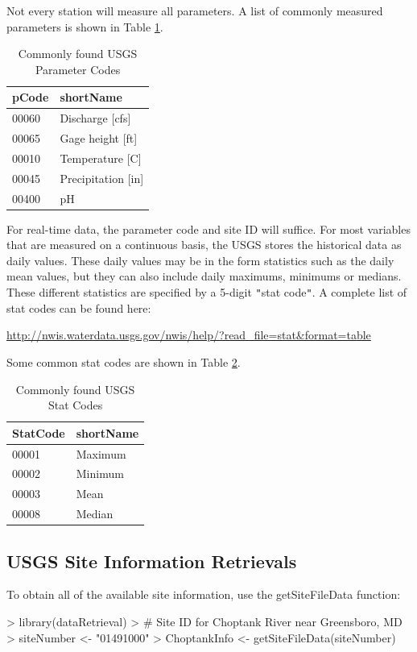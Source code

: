\documentclass[a4paper,11pt]{article}
\begin{document}
Not every station will measure all parameters. A list of commonly measured parameters is shown in Table \ref{tab:params}.



\begin{table}[ht]
\centering
\caption{Commonly found USGS Parameter Codes} 
\label{tab:params}
\begin{tabular}{ll}
  \hline
pCode & shortName \\ 
  \hline
00060 & Discharge [cfs] \\ 
  00065 & Gage height [ft] \\ 
  00010 & Temperature [C] \\ 
  00045 & Precipitation [in] \\ 
  00400 & pH \\ 
   \hline
\end{tabular}
\end{table}
For real-time data, the parameter code and site ID will suffice.  For most variables that are measured on a continuous basis, the USGS stores the historical data as daily values.  These daily values may be in the form statistics such as the daily mean values, but they can also include daily maximums, minimums or medians.  These different statistics are specified by a 5-digit \texttt{"}stat code\texttt{"}.  A complete list of stat codes can be found here:

\url{http://nwis.waterdata.usgs.gov/nwis/help/?read_file=stat&format=table}

Some common stat codes are shown in Table \ref{tab:stat}.
\begin{table}[ht]
\centering
\caption{Commonly found USGS Stat Codes} 
\label{tab:stat}
\begin{tabular}{ll}
  \hline
StatCode & shortName \\ 
  \hline
00001 & Maximum \\ 
  00002 & Minimum \\ 
  00003 & Mean \\ 
  00008 & Median \\ 
   \hline
\end{tabular}
\end{table}

\subsection{USGS Site Information Retrievals}
\label{sec:usgsSite}
To obtain all of the available site information, use the getSiteFileData function:
\begin{Schunk}
\begin{Sinput}
> library(dataRetrieval)
> # Site ID for Choptank River near Greensboro, MD
> siteNumber <- "01491000" 
> ChoptankInfo <- getSiteFileData(siteNumber)
\end{Sinput}
\end{Schunk}
\end{document}
